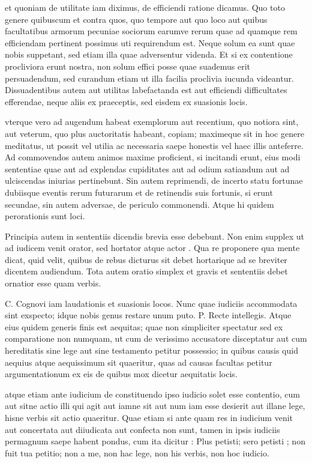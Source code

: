  et quoniam de utilitate iam diximus, de efficiendi ratione dicamus. Quo toto genere quibuscum et contra quos, quo tempore aut quo loco aut quibus facultatibus armorum pecuniae sociorum earumve rerum quae ad quamque rem efficiendam pertinent possimus uti requirendum est. Neque solum ea sunt quae nobis suppetant, sed etiam illa quae adversentur videnda. Et si ex contentione procliviora erunt nostra, non solum effici posse quae suademus erit persuadendum, sed curandum etiam ut illa facilia proclivia iucunda videantur. Dissuadentibus autem aut utilitas labefactanda est aut efficiendi difficultates efferendae, neque aliis ex praeceptis, sed eisdem ex suasionis locis.

 vterque vero ad augendum habeat exemplorum aut recentium, quo notiora sint, aut veterum, quo plus auctoritatis habeant, copiam; maximeque sit in hoc genere meditatus, ut possit vel utilia ac necessaria saepe honestis vel haec illis anteferre. Ad commovendos autem animos maxime proficient, si incitandi erunt, eius modi sententiae quae aut ad explendas cupiditates aut ad odium satiandum aut ad ulciscendas iniurias pertinebunt. Sin autem reprimendi, de incerto statu fortunae dubiisque eventis rerum futurarum et de retinendis suis fortunis, si erunt secundae, sin autem adversae, de periculo commonendi. Atque hi quidem perorationis sunt loci.

 Principia autem in sententiis dicendis brevia esse debebunt. Non enim supplex ut ad iudicem venit orator, sed hortator atque actor . Qua re proponere qua mente dicat, quid velit, quibus de rebus dicturus sit debet hortarique ad se breviter dicentem audiendum. Tota autem oratio simplex et gravis et sententiis debet ornatior esse quam verbis.

 C. Cognovi iam laudationis et suasionis locos. Nunc quae iudiciis accommodata sint exspecto; idque nobis genus restare unum puto. P. Recte intellegis. Atque eius quidem generis finis est aequitas; quae non simpliciter spectatur sed ex comparatione non numquam, ut cum de verissimo accusatore disceptatur aut cum hereditatis sine lege aut sine testamento petitur possessio; in quibus causis quid aequius atque aequissimum sit quaeritur, quas ad causas facultas petitur argumentationum ex eis de quibus mox dicetur aequitatis locis.

 atque etiam ante iudicium de constituendo ipso iudicio solet esse contentio, cum aut sitne actio illi qui agit aut iamne sit aut num iam esse desierit aut illane lege, hisne verbis sit actio quaeritur. Quae etiam si ante quam res in iudicium venit aut concertata aut diiudicata aut confecta non sunt, tamen in ipsis iudiciis permagnum saepe habent pondus, cum ita dicitur : Plus petisti; sero petisti ; non fuit tua petitio; non a me, non hac lege, non his verbis, non hoc iudicio.

